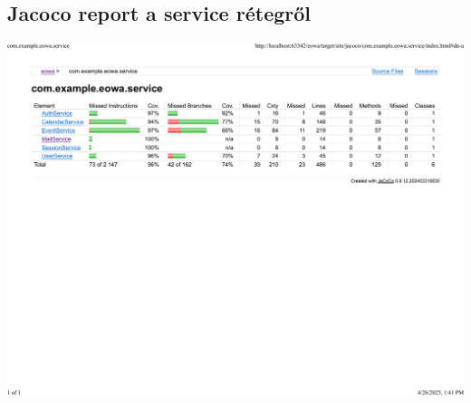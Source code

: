 \documentclass[a4paper,12pt]{report}
\theoremstyle{definition}
\theoremstyle{remark}
\begin{document}
\subsection{Jacoco report a service rétegről}
\label{jacocoservice}
\begin{center}
\includegraphics[width=170mm]{jacoco_service.pdf}

\end{center}


\vspace{2 cm}
\end{document}
